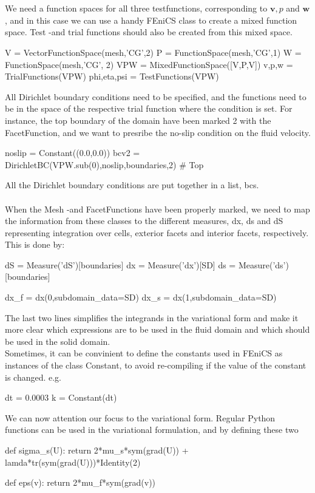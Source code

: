 \\ \\	
We need a function spaces for all three testfunctions, corresponding to $\mathbf{v}, p$ and $\mathbf{w}$, and in this case we can use a handy FEniCS class to create a mixed function space. Test -and trial functions should also be created from this mixed space.
\begin{cverbatim}
V = VectorFunctionSpace(mesh,'CG',2)
P = FunctionSpace(mesh,'CG',1)
W = FunctionSpace(mesh,'CG', 2)
VPW = MixedFunctionSpace([V,P,V])
v,p,w = TrialFunctions(VPW)
phi,eta,psi = TestFunctions(VPW)
\end{cverbatim}
All Dirichlet boundary conditions need to be specified, and the functions need to be in the space of the respective trial function where the condition is set. For instance, the top boundary of the domain have been marked 2 with the FacetFunction, and we want to presribe the no-slip condition on the fluid velocity.
\begin{cverbatim}
noslip = Constant((0.0,0.0))
bcv2 = DirichletBC(VPW.sub(0),noslip,boundaries,2) # Top
\end{cverbatim}
All the Dirichlet boundary conditions are put together in a list, bcs.\\ \\
When the Mesh -and FacetFunctions have been properly marked, we need to map the information from these classes to the different measures, dx, ds and dS representing integration over cells, exterior facets and interior facets, respectively. This is done by:
\begin{cverbatim}
dS = Measure('dS')[boundaries]
dx = Measure('dx')[SD]
ds = Measure('ds')[boundaries]

dx_f = dx(0,subdomain_data=SD)
dx_s = dx(1,subdomain_data=SD)
\end{cverbatim}
The last two lines simplifies the integrands in the variational form and make it more clear which expressions are to be used in the fluid domain and which should be used in the solid domain.
\\
Sometimes, it can be convinient to define the constants used in FEniCS as instances of the class Constant, to avoid re-compiling if the value of the constant is changed. e.g.
\begin{cverbatim}
dt = 0.0003
k = Constant(dt)
\end{cverbatim}
We can now attention our focus to the variational form. Regular Python functions can be used in the variational formulation, and by defining these two
\begin{cverbatim}
def sigma_s(U):
	return 2*mu_s*sym(grad(U)) + lamda*tr(sym(grad(U)))*Identity(2)

def eps(v):
	return 2*mu_f*sym(grad(v))
\end{cverbatim}

